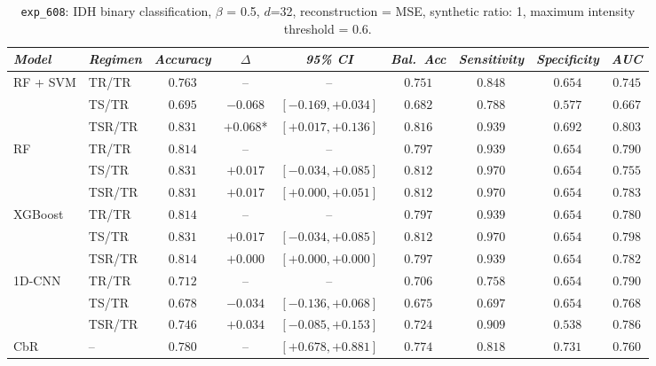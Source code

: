 \begin{table}[H]
\centering
\scriptsize

\label{tab:ctrl_exp_608_thr}
\begin{tabular*}{\textwidth}{@{\extracolsep{\fill}}llccccccc}
\toprule
\emph{Model} & \emph{Regimen} & \emph{Accuracy} & \emph{$\Delta$} & \emph{95\% CI} & \emph{Bal.\ Acc} & \emph{Sensitivity} & \emph{Specificity} & \emph{AUC}\\
\midrule
\multirow{3}{*}{RF + SVM} & TR/TR & $0.763$ & -- & -- & $0.751$ & $0.848$ & $0.654$ & $0.745$\\
 & TS/TR & $0.695$ & $-0.068$ & $[-0.169, +0.034]$ & $0.682$ & $0.788$ & $0.577$ & $0.667$\\
 & TSR/TR & $0.831$ & $+0.068$* & $[+0.017, +0.136]$ & $0.816$ & $0.939$ & $0.692$ & $0.803$\\
\midrule
\multirow{3}{*}{RF} & TR/TR & $0.814$ & -- & -- & $0.797$ & $0.939$ & $0.654$ & $0.790$\\
 & TS/TR & $0.831$ & $+0.017$ & $[-0.034, +0.085]$ & $0.812$ & $0.970$ & $0.654$ & $0.755$\\
 & TSR/TR & $0.831$ & $+0.017$ & $[+0.000, +0.051]$ & $0.812$ & $0.970$ & $0.654$ & $0.783$\\
\midrule
\multirow{3}{*}{XGBoost} & TR/TR & $0.814$ & -- & -- & $0.797$ & $0.939$ & $0.654$ & $0.780$\\
 & TS/TR & $0.831$ & $+0.017$ & $[-0.034, +0.085]$ & $0.812$ & $0.970$ & $0.654$ & $0.798$\\
 & TSR/TR & $0.814$ & $+0.000$ & $[+0.000, +0.000]$ & $0.797$ & $0.939$ & $0.654$ & $0.782$\\
\midrule
\multirow{3}{*}{1D-CNN} & TR/TR & $0.712$ & -- & -- & $0.706$ & $0.758$ & $0.654$ & $0.790$\\
 & TS/TR & $0.678$ & $-0.034$ & $[-0.136, +0.068]$ & $0.675$ & $0.697$ & $0.654$ & $0.768$\\
 & TSR/TR & $0.746$ & $+0.034$ & $[-0.085, +0.153]$ & $0.724$ & $0.909$ & $0.538$ & $0.786$\\
\midrule
CbR & -- & $0.780$ & -- & $[+0.678, +0.881]$ & $0.774$ & $0.818$ & $0.731$ & $0.760$\\
\bottomrule
\end{tabular*}
\caption{\small \texttt{exp\_608}: IDH binary classification, $\beta$ = 0.5, $d$=32, reconstruction = MSE, synthetic ratio: 1, maximum intensity threshold = 0.6.}
\end{table}

